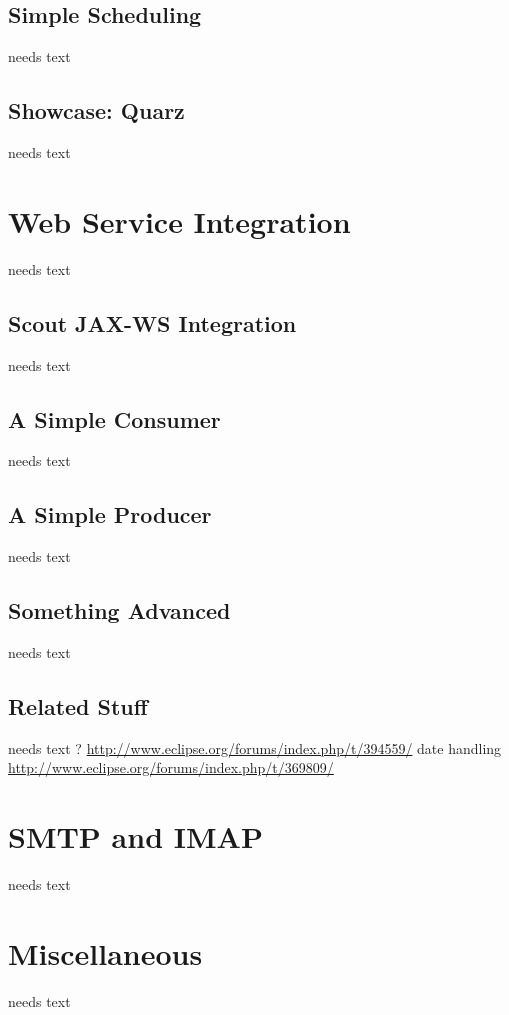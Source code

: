 \documentclass[a4paper,10pt,twoside]{book}
\begin{document}
\subsection{Simple Scheduling}
needs text

\subsection{Showcase: Quarz}
needs text
    

\section{Web Service Integration}
needs text

\subsection{Scout JAX-WS Integration}
needs text

\subsection{A Simple Consumer}
needs text

\subsection{A Simple Producer}
needs text

\subsection{Something Advanced}
needs text

\subsection{Related Stuff}
needs text
? \url{http://www.eclipse.org/forums/index.php/t/394559/}
date handling \url{http://www.eclipse.org/forums/index.php/t/369809/}

\section{SMTP and IMAP}
needs text

\section{Miscellaneous}
needs text
\end{document}
